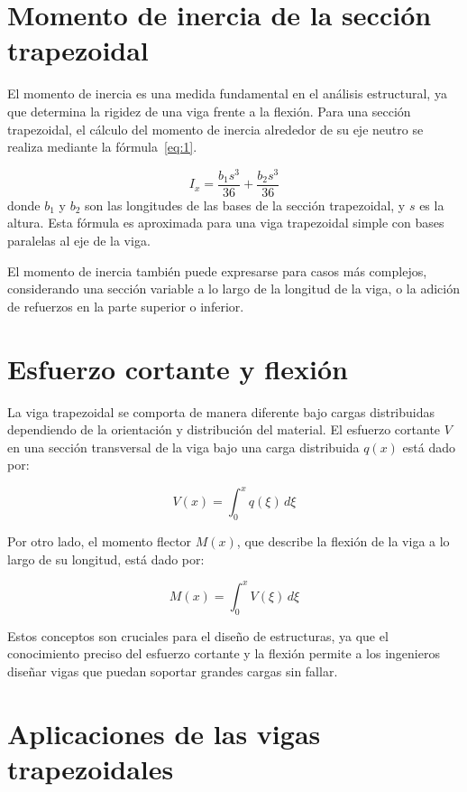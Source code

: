 \section{Momento de inercia de la sección trapezoidal}

El momento de inercia es una medida fundamental en el análisis estructural, ya que determina la rigidez de una viga frente a la flexión. Para una sección trapezoidal, el cálculo del momento de inercia alrededor de su eje neutro se realiza mediante la fórmula~\eqref{eq:1}.

\begin{equation}
I_x = \frac{b_1 s^3}{36} + \frac{b_2 s^3}{36}
\label{eq:1}
\end{equation}
donde $b_1$ y $b_2$ son las longitudes de las bases de la sección trapezoidal, y $s$ es la altura. Esta fórmula es aproximada para una viga trapezoidal simple con bases paralelas al eje de la viga.

El momento de inercia también puede expresarse para casos más complejos, considerando una sección variable a lo largo de la longitud de la viga, o la adición de refuerzos en la parte superior o inferior.

\section{Esfuerzo cortante y flexión}

La viga trapezoidal se comporta de manera diferente bajo cargas distribuidas dependiendo de la orientación y distribución del material. El esfuerzo cortante $V$ en una sección transversal de la viga bajo una carga distribuida $q(x)$ está dado por:

\begin{equation}
V(x) = \int_0^x q(\xi)\, d\xi
\end{equation}

Por otro lado, el momento flector $M(x)$, que describe la flexión de la viga a lo largo de su longitud, está dado por:

\begin{equation}
M(x) = \int_0^x V(\xi)\, d\xi
\end{equation}

Estos conceptos son cruciales para el diseño de estructuras, ya que el conocimiento preciso del esfuerzo cortante y la flexión permite a los ingenieros diseñar vigas que puedan soportar grandes cargas sin fallar.

\section{Aplicaciones de las vigas trapezoidales}

